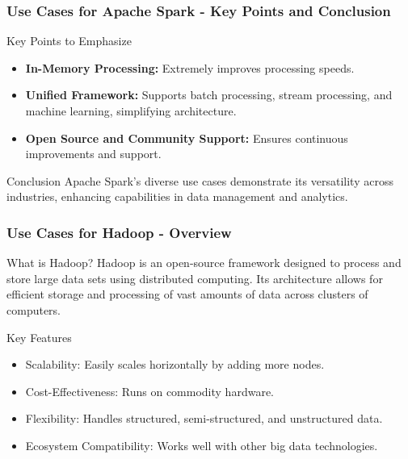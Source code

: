\documentclass{beamer}
\begin{document}
\begin{frame}[fragile]
    \frametitle{Use Cases for Apache Spark - Key Points and Conclusion}
    \begin{block}{Key Points to Emphasize}
        \begin{itemize}
            \item \textbf{In-Memory Processing:} Extremely improves processing speeds.
            \item \textbf{Unified Framework:} Supports batch processing, stream processing, and machine learning, simplifying architecture.
            \item \textbf{Open Source and Community Support:} Ensures continuous improvements and support.
        \end{itemize}
    \end{block}
    
    \begin{block}{Conclusion}
        Apache Spark's diverse use cases demonstrate its versatility across industries, enhancing capabilities in data management and analytics.
    \end{block}
\end{frame}

\begin{frame}[fragile]
    \frametitle{Use Cases for Hadoop - Overview}
    \begin{block}{What is Hadoop?}
        Hadoop is an open-source framework designed to process and store large data sets using distributed computing. Its architecture allows for efficient storage and processing of vast amounts of data across clusters of computers.
    \end{block}
    
    \begin{block}{Key Features}
        \begin{itemize}
            \item Scalability: Easily scales horizontally by adding more nodes.
            \item Cost-Effectiveness: Runs on commodity hardware.
            \item Flexibility: Handles structured, semi-structured, and unstructured data.
            \item Ecosystem Compatibility: Works well with other big data technologies.
        \end{itemize}
    \end{block}
\end{frame}
\end{document}
